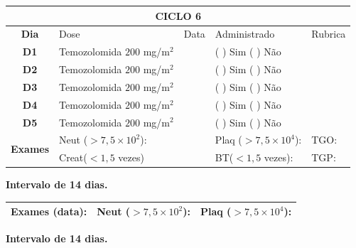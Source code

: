 \documentclass[11pt,a4paper,oldfontcommands]{memoir}
\begin{document}
\begin{center}
\begin{longtable}{p{1cm}p{4cm}|p{1cm}|p{4.6cm}|p{3cm}}
	\hline
	\multicolumn{5}{c}{\textbf{CICLO 6}}\\
\hline
    \multicolumn{1}{c|}{\multirow{1}{*}{\textbf{Dia}}}&{Dose}&{Data}&{Administrado}&{Rubrica} \\
    \hline
    \multicolumn{1}{c|}{\multirow{1}{*}{\textbf{D1}}}&{Temozolomida \(200\) mg/m\(^2\)}&&{(  ) Sim (  ) Não}&\\
    \multicolumn{1}{c|}{\multirow{1}{*}{\textbf{D2}}}&{Temozolomida \(200\) mg/m\(^2\)}&&{(  ) Sim (  ) Não}&\\
    \multicolumn{1}{c|}{\multirow{1}{*}{\textbf{D3}}}&{Temozolomida \(200\) mg/m\(^2\)}&&{(  ) Sim (  ) Não}&\\
    \multicolumn{1}{c|}{\multirow{1}{*}{\textbf{D4}}}&{Temozolomida \(200\) mg/m\(^2\)}&&{(  ) Sim (  ) Não}&\\
    \multicolumn{1}{c|}{\multirow{1}{*}{\textbf{D5}}}&{Temozolomida \(200\) mg/m\(^2\)}&&{(  ) Sim (  ) Não}&\\
    \hline
    \multicolumn{1}{c|}{\multirow{2}{*}{\textbf{Exames}}}&\multicolumn{2}{l|}{Neut (\(>7,5\times10^2\)):}&{Plaq (\(>7,5\times10^4\)):}&{TGO:}\\
    \cline{2-5}
    \multicolumn{1}{c|}{\multirow{2}{*}{{}}}&\multicolumn{2}{l|}{Creat(\(<1,5\) vezes)}&{BT(\(<1,5\) vezes):}&{TGP:}
    \\
    \hline
\end{longtable}
\textbf{Intervalo de 14 dias.}
\begin{longtable}{p{5cm}|p{5cm}|p{4.5cm}}
    \hline
    \textbf{Exames (data):}&{Neut (\(>7,5\times10^2\)):}&{Plaq (\(>7,5\times10^4\)):}
    \\
    \hline
\end{longtable}
\textbf{Intervalo de 14 dias.}
\end{center}
\end{document}
